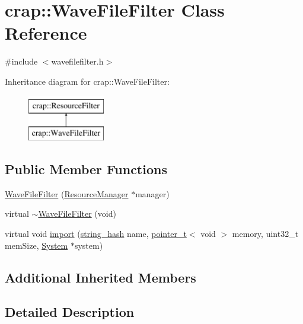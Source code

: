 \hypertarget{classcrap_1_1_wave_file_filter}{}\section{crap\+:\+:Wave\+File\+Filter Class Reference}
\label{classcrap_1_1_wave_file_filter}


{\ttfamily \#include $<$wavefilefilter.\+h$>$}

Inheritance diagram for crap\+:\+:Wave\+File\+Filter\+:\begin{figure}[H]
\begin{center}
\leavevmode
\includegraphics[height=2.000000cm]{classcrap_1_1_wave_file_filter}
\end{center}
\end{figure}
\subsection*{Public Member Functions}
\begin{DoxyCompactItemize}
\item 
\hyperlink{classcrap_1_1_wave_file_filter_a3cfcb3d2a4fe523d9d6ffd5c7d48e1ea}{Wave\+File\+Filter} (\hyperlink{classcrap_1_1_resource_manager}{Resource\+Manager} $\ast$manager)
\item 
virtual \hyperlink{classcrap_1_1_wave_file_filter_a90a1455ad847f71251f0d7c73932d132}{$\sim$\+Wave\+File\+Filter} (void)
\item 
virtual void \hyperlink{classcrap_1_1_wave_file_filter_a74553a7c3abfebd09edb2c386879f4a3}{import} (\hyperlink{classcrap_1_1string__hash}{string\+\_\+hash} name, \hyperlink{structcrap_1_1pointer__t}{pointer\+\_\+t}$<$ void $>$ memory, uint32\+\_\+t mem\+Size, \hyperlink{classcrap_1_1_system}{System} $\ast$system)
\end{DoxyCompactItemize}
\subsection*{Additional Inherited Members}


\subsection{Detailed Description}


